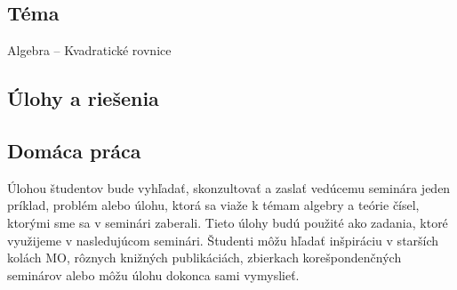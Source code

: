 
\subsection*{Téma}
Algebra -- Kvadratické rovnice

\subsection*{Úlohy a riešenia}















\subsection*{Domáca práca}

Úlohou študentov bude vyhľadať, skonzultovať a zaslať vedúcemu seminára jeden príklad, problém alebo úlohu, ktorá sa viaže k témam algebry a teórie čísel, ktorými sme sa v seminári zaberali. Tieto úlohy budú použité ako zadania, ktoré využijeme v nasledujúcom seminári. Študenti môžu hľadať inšpiráciu v starších kolách MO, rôznych knižných publikáciách, zbierkach korešpondenčných seminárov alebo môžu úlohu dokonca sami vymyslieť.


